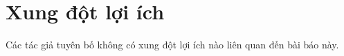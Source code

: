 
\section{Xung đột lợi ích}

Các tác giả tuyên bố không có xung đột lợi ích nào liên quan đến bài báo này.
